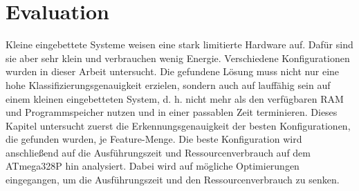 \chapter{Evaluation}
Kleine eingebettete Systeme weisen eine stark limitierte Hardware auf. Dafür sind sie aber sehr klein und verbrauchen wenig Energie. Verschiedene Konfigurationen wurden in dieser Arbeit untersucht. Die gefundene
Lösung muss nicht nur eine hohe Klassifizierungsgenauigkeit erzielen, sondern auch auf lauffähig sein auf einem kleinen eingebetteten System, d. h. nicht mehr als den verfügbaren RAM und Programmspeicher nutzen und in
einer passablen Zeit terminieren.
\newline
\newline
Dieses Kapitel untersucht zuerst die Erkennungsgenauigkeit der besten Konfigurationen, die gefunden wurden, je Feature-Menge. Die beste Konfiguration wird anschließend auf die Ausführungszeit
und Ressourcenverbrauch auf dem ATmega328P hin analysiert. Dabei wird auf mögliche Optimierungen eingegangen, um die Ausführungszeit und den Ressourcenverbrauch zu senken.



